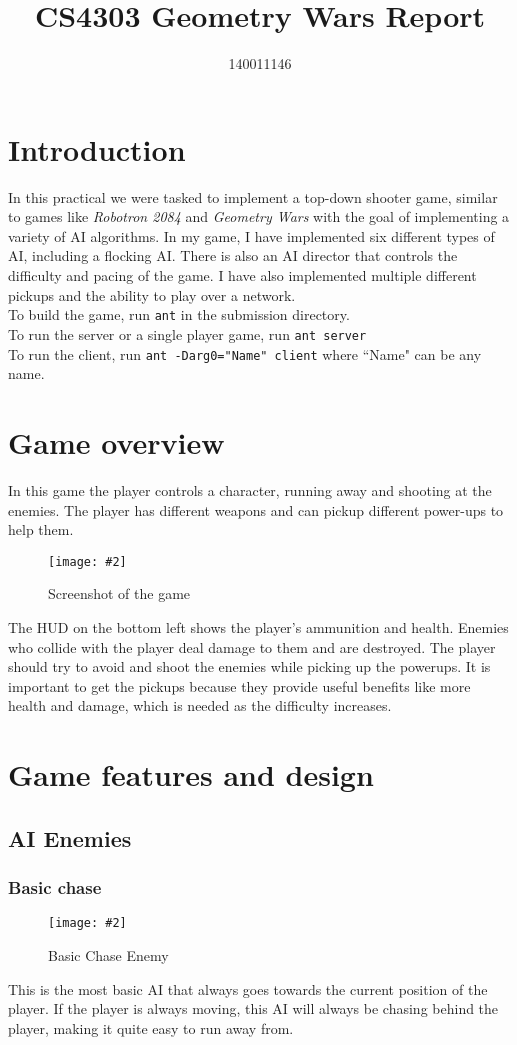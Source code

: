 \documentclass{article}
\title{CS4303 Geometry Wars Report}
\author{140011146}
\newcommand{\n}[0]{\\[\baselineskip]}
\newcommand{\figimg}[3]{
  \begin{figure}[H]
    \centering
    \texttt{[image: \#2]}
    \caption{#3}
  \end{figure}
  \noindent 
}
\begin{document}
\maketitle

\section{Introduction}
In this practical we were tasked to implement a top-down shooter game, similar to games like \textit{Robotron 2084} and \textit{Geometry Wars} with the goal of implementing a variety of AI algorithms. In my game, I have implemented six different types of AI, including a flocking AI. There is also an AI director that controls the difficulty and pacing of the game. I have also implemented multiple different pickups and the ability to play over a network.
\n
To build the game, run \texttt{ant} in the submission directory.
\\
\noindent
To run the server or a single player game, run \texttt{ant server}
\\
\noindent
To run the client, run \texttt{ant -Darg0="Name" client} where ``Name" can be any name.
\section{Game overview}
In this game the player controls a character, running away and shooting at the enemies. The player has different weapons and can pickup different power-ups to help them.
\figimg{1}{imgs/Screenshot.png}{Screenshot of the game}
The HUD on the bottom left shows the player's ammunition and health. Enemies who collide with the player deal damage to them and are destroyed. The player should try to avoid and shoot the enemies while picking up the powerups. It is important to get the pickups because they provide useful benefits like more health and damage, which is needed as the difficulty increases.
\section{Game features and design}
\subsection{AI Enemies}
\subsubsection{Basic chase}
\figimg{0.1}{imgs/BasicChaseEnemy.png}{Basic Chase Enemy}
This is the most basic AI that always goes towards the current position of the player. If the player is always moving, this AI will always be chasing behind the player, making it quite easy to run away from.
\end{document}
